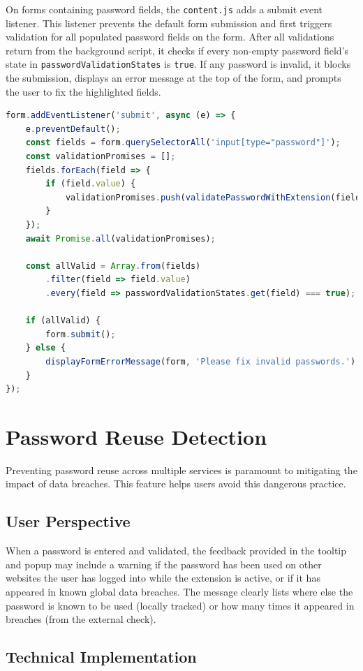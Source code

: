 \documentclass[11pt,oneside,a4paper]{book}
\begin{document}
On forms containing password fields, the \texttt{content.js} adds a submit event listener. This listener prevents the default form submission and first triggers validation for all populated password fields on the form. After all validations return from the background script, it checks if every non-empty password field's state in \texttt{passwordValidationStates} is \texttt{true}. If any password is invalid, it blocks the submission, displays an error message at the top of the form, and prompts the user to fix the highlighted fields.
\begin{lstlisting}[language=JavaScript, caption=Content Script Form Submit Listener]
form.addEventListener('submit', async (e) => {
    e.preventDefault();
    const fields = form.querySelectorAll('input[type="password"]');
    const validationPromises = [];
    fields.forEach(field => {
        if (field.value) {
            validationPromises.push(validatePasswordWithExtension(field.value, field));
        }
    });
    await Promise.all(validationPromises);

    const allValid = Array.from(fields)
        .filter(field => field.value)
        .every(field => passwordValidationStates.get(field) === true);

    if (allValid) {
        form.submit();
    } else {
        displayFormErrorMessage(form, 'Please fix invalid passwords.');
    }
});
\end{lstlisting}

\section{Password Reuse Detection}
Preventing password reuse across multiple services is paramount to mitigating the impact of data breaches. This feature helps users avoid this dangerous practice.

\subsection{User Perspective}
When a password is entered and validated, the feedback provided in the tooltip and popup may include a warning if the password has been used on other websites the user has logged into while the extension is active, or if it has appeared in known global data breaches. The message clearly lists where else the password is known to be used (locally tracked) or how many times it appeared in breaches (from the external check).

\subsection{Technical Implementation}
\end{document}
